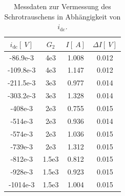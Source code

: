 \documentclass[sn-mathphys-num,iicol]{sn-jnl}
\theoremstyle{thmstyleone}
\theoremstyle{thmstyletwo}
\theoremstyle{thmstylethree}
\begin{document}
\begin{table}[h]
	\begin{tabular}{S[table-format=-3.1e1]S[table-format=1.1e1]S[table-format=1.3]S[table-format=1.3]}
		\toprule
		$i_\text{dc}[\SI{}{V}]$ & $G_{2}$ & $I[\SI{}{A}]$ & $\Delta I[\SI{}{V}]$ \\
		\midrule
		-86.9e-3                & 4e3     & 1.008         & 0.012                \\
		-109.8e-3               & 4e3     & 1.147         & 0.012                \\
		-211.5e-3               & 3e3     & 0.977         & 0.014                \\
		-303.2e-3               & 3e3     & 1.328         & 0.014                \\
		-408e-3                 & 2e3     & 0.755         & 0.015                \\
		-514e-3                 & 2e3     & 0.936         & 0.014                \\
		-574e-3                 & 2e3     & 1.036         & 0.015                \\
		-739e-3                 & 2e3     & 1.312         & 0.015                \\
		-812e-3                 & 1.5e3   & 0.812         & 0.015                \\
		-928e-3                 & 1.5e3   & 0.923         & 0.015                \\
		-1014e-3                & 1.5e3   & 1.004         & 0.015                \\
		\bottomrule
	\end{tabular}
	\caption{Messdaten zur Vermessung des Schrotrauschens in Abhängigkeit von $i_\text{dc}$.}
	\label{tab:schrot_idc}
\end{table}


\end{document}
